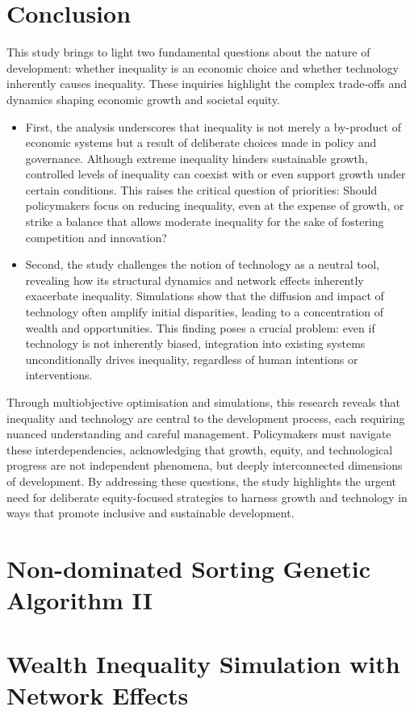 \documentclass[12pt]{article}
\begin{document}
\section{Conclusion} 
This study brings to light two fundamental questions about the nature of development: whether inequality is an economic choice and whether technology inherently causes inequality. These inquiries highlight the complex trade-offs and dynamics shaping economic growth and societal equity.
\begin{itemize}
    \item First, the analysis underscores that inequality is not merely a by-product of economic systems but a result of deliberate choices made in policy and governance. Although extreme inequality hinders sustainable growth, controlled levels of inequality can coexist with or even support growth under certain conditions. This raises the critical question of priorities: Should policymakers focus on reducing inequality, even at the expense of growth, or strike a balance that allows moderate inequality for the sake of fostering competition and innovation?
    \item Second, the study challenges the notion of technology as a neutral tool, revealing how its structural dynamics and network effects inherently exacerbate inequality. Simulations show that the diffusion and impact of technology often amplify initial disparities, leading to a concentration of wealth and opportunities. This finding poses a crucial problem: even if technology is not inherently biased,  integration into existing systems unconditionally drives inequality, regardless of human intentions or interventions.
\end{itemize}

Through multiobjective optimisation and simulations, this research reveals that inequality and technology are central to the development process, each requiring nuanced understanding and careful management. Policymakers must navigate these interdependencies, acknowledging that growth, equity, and technological progress are not independent phenomena, but deeply interconnected dimensions of development. By addressing these questions, the study highlights the urgent need for deliberate equity-focused strategies to harness growth and technology in ways that promote inclusive and sustainable development.

\newpage


\newpage
\printbibliography

\newpage
\appendix
\small
\section{Non-dominated Sorting Genetic Algorithm II} \label{ap:NSGA}

\newpage
\section{Wealth Inequality Simulation with Network Effects}
\label{ap:simulation}

\newpage

\end{document}
